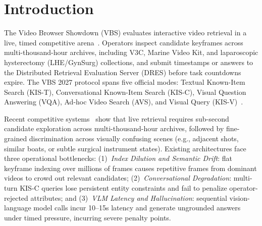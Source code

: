 \documentclass[runningheads,a4paper]{llncs}
\begin{document}
\section{Introduction}
\label{sec:intro}

The Video Browser Showdown (VBS) evaluates interactive video retrieval in a live, timed competitive arena~\cite{lokoc2023vbs,rossetto2025vbs}. Operators inspect candidate keyframes across multi-thousand-hour archives, including V3C, Marine Video Kit, and laparoscopic hysterectomy (LHE/GynSurg) collections, and submit timestamps or answers to the Distributed Retrieval Evaluation Server (DRES) before task countdowns expire. The VBS 2027 protocol spans five official modes: Textual Known-Item Search (KIS-T), Conversational Known-Item Search (KIS-C), Visual Question Answering (VQA), Ad-hoc Video Search (AVS), and Visual Query (KIS-V)~\cite{vbs2027call}.

Recent competitive systems~\cite{jackl2026prak,tran2026niiuit,khan2026exquisitor} show that live retrieval requires sub-second candidate exploration across multi-thousand-hour archives, followed by fine-grained discrimination across visually confusing scenes (e.g., adjacent shots, similar boats, or subtle surgical instrument states). Existing architectures face three operational bottlenecks:
(1)~\emph{Index Dilution and Semantic Drift}: flat keyframe indexing over millions of frames causes repetitive frames from dominant videos to crowd out relevant candidates;
(2)~\emph{Conversational Degradation}: multi-turn KIS-C queries lose persistent entity constraints and fail to penalize operator-rejected attributes; and
(3)~\emph{VLM Latency and Hallucination}: sequential vision-language model calls incur 10--15s latency and generate ungrounded answers under timed pressure, incurring severe penalty points.
\end{document}
